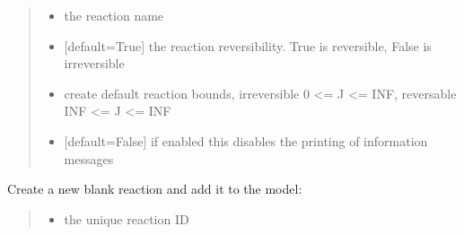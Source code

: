 \documentclass[letterpaper,12pt,english]{sphinxmanual}
\begin{document}
\begin{fulllineitems}
\begin{fulllineitems}
\begin{quote}
\begin{description}
\begin{itemize}
\item {} 
\sphinxAtStartPar
{} \textendash{} the reaction name

\item {} 
\sphinxAtStartPar
{} \textendash{} {[}default=True{]} the reaction reversibility. True is reversible, False is irreversible

\item {} 
\sphinxAtStartPar
{} \textendash{} create default reaction bounds, irreversible 0 \textless{}= J \textless{}= INF, reversable \sphinxhyphen{}INF \textless{}= J \textless{}= INF

\item {} 
\sphinxAtStartPar
{} \textendash{} {[}default=False{]} if enabled this disables the printing of information messages

\end{itemize}

\end{description}\end{quote}

\end{fulllineitems}


\begin{fulllineitems}
\label{\detokenize{api/core:cbmpy.CBModel.Model.createReactionNew}}
\pysigstartsignatures
\pysiglinewithargsret
{}
{\sphinxparamcomma {}\sphinxparamcomma {}\sphinxparamcomma {}\sphinxparamcomma {}\sphinxparamcomma {}}
{}
\pysigstopsignatures
\sphinxAtStartPar
Create a new blank reaction and add it to the model:
\begin{quote}\begin{description}
\begin{itemize}
\item {} 
\sphinxAtStartPar
{} \textendash{} the unique reaction ID


\end{itemize}
\end{description}
\end{quote}
\end{fulllineitems}
\end{fulllineitems}
\end{document}
